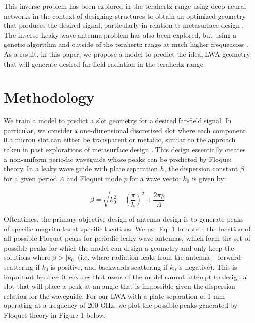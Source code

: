 \documentclass[11pt]{article}
\begin{document}
\noindent This inverse problem has been explored in the terahertz range using deep neural networks in the context of designing structures to obtain an optimized geometry that produces the desired signal, particularly in relation to metasurface design \cite{Deng:21, 9602997}. The inverse Leaky-wave antenna problem has also been explored, but using a genetic algorithm and outside of the terahertz range at much higher frequencies \cite{Jafar-Zanjani:2018vy}. As a result, in this paper, we propose a model to predict the ideal LWA geometry that will generate desired far-field radiation in the terahertz range.

\section*{Methodology}

We train a model to predict a slot geometry for a desired far-field signal. In particular, we consider a one-dimensional discretized slot where each component 0.5 micron slot can either be transparent or metallic, similar to the approach taken in past explorations of metasurface design \cite{Jafar-Zanjani:2018vy}. This design essentially creates a non-uniform periodic waveguide whose peaks can be predicted by Floquet theory. In a leaky wave guide with plate separation $h$, the dispersion constant $\beta$ for a given period $\Lambda$ and Floquet mode $p$ for a wave vector $k_0$ is given by:

\[\beta=\sqrt{k_0^2 - (\frac{\pi}{h})^2} +\frac{2\pi p}{\Lambda} \tag{1} \label{eq:special}\] 

\noindent Oftentimes, the primary objective design of antenna design is to generate peaks of specific magnitudes at specific locations. We use Eq. 1 to  obtain the location of all possible Floquet peaks for periodic leaky wave antennas, which form the set of possible peaks for which the model can design a geometry and only keep the solutions where $\beta > |k_0|$ (i.e. where radiation leaks from the antenna -- forward scattering if $k_0$ is positive, and backwards scattering if $k_0$ is negative). This is important because it ensures that users of the model cannot attempt to design a slot that will place a peak at an angle that is impossible given the dispersion relation for the waveguide. For our LWA with a plate separation of 1 mm operating at a frequency of 200 GHz, we plot the possible peaks generated by Floquet theory in Figure 1 below. \\
\end{document}

